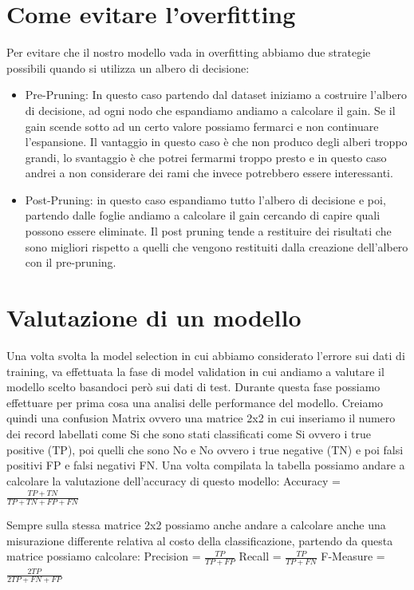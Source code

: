 \documentclass[14pt]{extreport}
\begin{document}
\section{Come evitare l'overfitting}

Per evitare che il nostro modello vada in overfitting abbiamo due strategie possibili quando si utilizza un albero di decisione:

\begin{itemize}
    \item Pre-Pruning: In questo caso partendo dal dataset iniziamo a costruire l'albero di decisione, ad ogni nodo che espandiamo andiamo a calcolare il gain. Se il gain scende sotto ad un certo valore possiamo fermarci e non continuare l'espansione.
    Il vantaggio in questo caso è che non produco degli alberi troppo grandi, lo svantaggio è che potrei fermarmi troppo presto e in questo caso andrei a non considerare dei rami che invece potrebbero essere interessanti.
    \item Post-Pruning: in questo caso espandiamo tutto l'albero di decisione e poi, partendo dalle foglie andiamo a calcolare il gain cercando di capire quali possono essere eliminate.
    Il post pruning tende a restituire dei risultati che sono migliori rispetto a quelli che vengono restituiti dalla creazione dell'albero con il pre-pruning.
\end{itemize}

\section{Valutazione di un modello}

Una volta svolta la model selection in cui abbiamo considerato l'errore sui dati di training, va effettuata la fase di model validation in cui andiamo a valutare il modello scelto basandoci però sui dati di test.
Durante questa fase possiamo effettuare per prima cosa una analisi delle performance del modello. 
Creiamo quindi una confusion Matrix ovvero una matrice 2x2 in cui inseriamo il numero dei record labellati come Si che sono stati classificati come Si ovvero i true positive (TP), poi quelli che sono No e No ovvero i true negative (TN) e poi falsi positivi FP e falsi negativi FN.
Una volta compilata la tabella possiamo andare a calcolare la valutazione dell'accuracy di questo modello:
Accuracy = $\frac{TP+TN}{TP+TN+FP+FN}$

Sempre sulla stessa matrice 2x2 possiamo anche andare a calcolare anche una misurazione differente relativa al costo della classificazione, partendo da questa matrice possiamo calcolare:
\newline
Precision = $\frac{TP}{TP+FP}$
\newline
Recall = $\frac{TP}{TP+FN}$
\newline 
F-Measure = $\frac{2TP}{2TP+FN+FP}$
\end{document}
